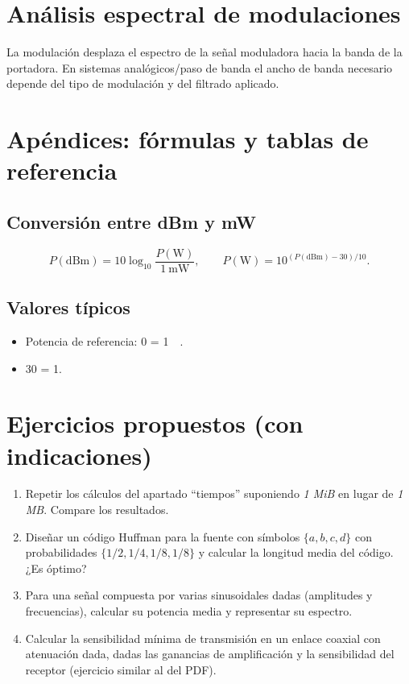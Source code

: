 \documentclass[11pt,a4paper]{article}
\newcommand{\dBm}{\mathrm{dBm}}
\newcommand{\Watt}{\mathrm{W}}
\begin{document}
\section{Análisis espectral de modulaciones}
La modulación desplaza el espectro de la señal moduladora hacia la banda de la portadora. En sistemas analógicos/paso de banda el ancho de banda necesario depende del tipo de modulación y del filtrado aplicado.

\section{Apéndices: fórmulas y tablas de referencia}

\subsection{Conversión entre dBm y mW}
\[
P(\dBm)=10\log_{10} \frac{P(\Watt)}{1\ \text{mW}},\qquad P(\Watt)=10^{(P(\dBm)-30)/10}.
\]

\subsection{Valores típicos}
\begin{itemize}
  \item Potencia de referencia: \SI{0}{\dBm} = \SI{1}{\milli\Watt}.
  \item \SI{30}{\dBm} = \SI{1}{\Watt}.
\end{itemize}

\section{Ejercicios propuestos (con indicaciones)}
\begin{enumerate}
  \item Repetir los cálculos del apartado ``tiempos'' suponiendo \emph{1 MiB} en lugar de \emph{1 MB}. Compare los resultados.
  \item Diseñar un código Huffman para la fuente con símbolos $\{a,b,c,d\}$ con probabilidades $\{1/2,1/4,1/8,1/8\}$ y calcular la longitud media del código. ¿Es óptimo?
  \item Para una señal compuesta por varias sinusoidales dadas (amplitudes y frecuencias), calcular su potencia media y representar su espectro.
  \item Calcular la sensibilidad mínima de transmisión en un enlace coaxial con atenuación dada, dadas las ganancias de amplificación y la sensibilidad del receptor (ejercicio similar al del PDF).
\end{enumerate}
\end{document}
